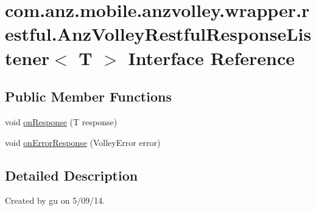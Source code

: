 \hypertarget{interfacecom_1_1anz_1_1mobile_1_1anzvolley_1_1wrapper_1_1restful_1_1_anz_volley_restful_response_listener_3_01_t_01_4}{\section{com.\+anz.\+mobile.\+anzvolley.\+wrapper.\+restful.\+Anz\+Volley\+Restful\+Response\+Listener$<$ T $>$ Interface Reference}
\label{interfacecom_1_1anz_1_1mobile_1_1anzvolley_1_1wrapper_1_1restful_1_1_anz_volley_restful_response_listener_3_01_t_01_4}
}
\subsection*{Public Member Functions}
\begin{DoxyCompactItemize}
\item 
void \hyperlink{interfacecom_1_1anz_1_1mobile_1_1anzvolley_1_1wrapper_1_1restful_1_1_anz_volley_restful_response_listener_3_01_t_01_4_a51b67294fb3b1671202d6f74cc53a4c0}{on\+Response} (T response)
\item 
void \hyperlink{interfacecom_1_1anz_1_1mobile_1_1anzvolley_1_1wrapper_1_1restful_1_1_anz_volley_restful_response_listener_3_01_t_01_4_a30de6de78bba5350271a36800efb566f}{on\+Error\+Response} (Volley\+Error error)
\end{DoxyCompactItemize}


\subsection{Detailed Description}
Created by gu on 5/09/14. 

